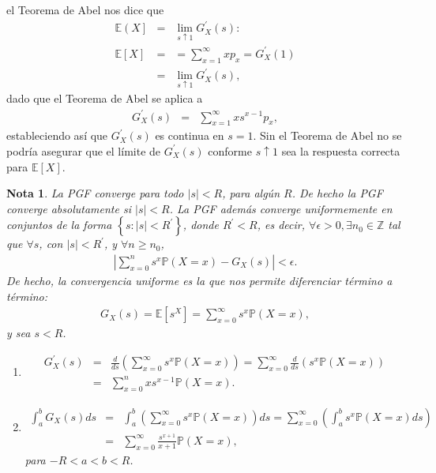 \documentclass{article}
\newtheorem{Note}{Nota}[section]
\newcommand{\ent}{\mathbb{Z}}
\newcommand{\esp}{\mathbb{E}}
\newcommand{\prob}{\mathbb{P}}
\numberwithin{equation}{section}
\begin{document}
{el Teorema de Abel nos dice que
\begin{eqnarray*}
\esp\left(X\right]&=&\lim_{s\uparrow1}G_{X}^{'}\left(s\right):\\
\esp\left[X\right]&=&=\sum_{x=1}^{\infty}xp_{x}=G_{X}^{'}\left(1\right)\\
&=&\lim_{s\uparrow1}G_{X}^{'}\left(s\right),
\end{eqnarray*}
dado que el Teorema de Abel se aplica a
\begin{eqnarray*}
G_{X}^{'}\left(s\right)&=&\sum_{x=1}^{\infty}xs^{x-1}p_{x},
\end{eqnarray*}
estableciendo as\'i que $G_{X}^{'}\left(s\right)$ es continua en $s=1$. Sin el Teorema de Abel no se podr\'ia asegurar que el l\'imite de $G_{X}^{'}\left(s\right)$ conforme $s\uparrow1$ sea la respuesta correcta para $\esp\left[X\right]$.

\begin{Note}
La PGF converge para todo $|s|<R$, para alg\'un $R$. De hecho la PGF converge absolutamente si $|s|<R$. La PGF adem\'as converge uniformemente en conjuntos de la forma $\left\{s:|s|<R^{'}\right\}$, donde $R^{'}<R$, es decir, $\forall\epsilon>0, \exists n_{0}\in\ent$ tal que $\forall s$, con $|s|<R^{'}$, y $\forall n\geq n_{0}$,
\begin{eqnarray*}
|\sum_{x=0}^{n}s^{x}\prob\left(X=x\right)-G_{X}\left(s\right)|<\epsilon.
\end{eqnarray*}
De hecho, la convergencia uniforme es la que nos permite diferenciar t\'ermino a t\'ermino:
\begin{eqnarray*}
G_{X}\left(s\right)=\esp\left[s^{X}\right]=\sum_{x=0}^{\infty}s^{x}\prob\left(X=x\right),
\end{eqnarray*}
y sea $s<R$.
\begin{enumerate}
\item
\begin{eqnarray*}
G_{X}^{'}\left(s\right)&=&\frac{d}{ds}\left(\sum_{x=0}^{\infty}s^{x}\prob\left(X=x\right)\right)=\sum_{x=0}^{\infty}\frac{d}{ds}\left(s^{x}\prob\left(X=x\right)\right)\\
&=&\sum_{x=0}^{n}xs^{x-1}\prob\left(X=x\right).
\end{eqnarray*}

\item\begin{eqnarray*}
\int_{a}^{b}G_{X}\left(s\right)ds&=&\int_{a}^{b}\left(\sum_{x=0}^{\infty}s^{x}\prob\left(X=x\right)\right)ds=\sum_{x=0}^{\infty}\left(\int_{a}^{b}s^{x}\prob\left(X=x\right)ds\right)\\
&=&\sum_{x=0}^{\infty}\frac{s^{x+1}}{x+1}\prob\left(X=x\right),
\end{eqnarray*}
para $-R<a<b<R$.
\end{enumerate}
\end{Note}

}
\end{document}

